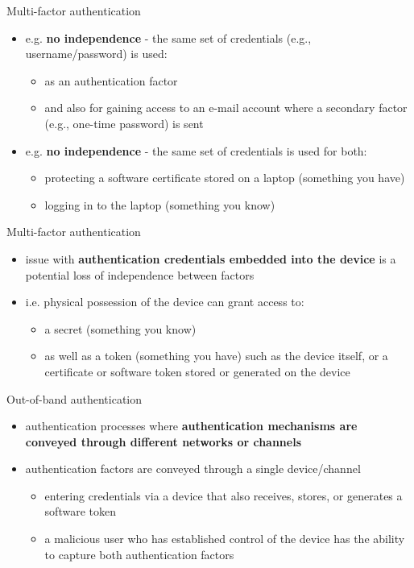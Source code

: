 \documentclass[pdf]{beamer}
\begin{document}
\begin{frame}{Multi-factor authentication}
\begin{itemize}
\item
e.g. \textbf{no independence} - the same set of credentials (e.g., username/password) is used:
\begin{itemize}
\item
as an authentication factor
\item
and also for gaining access to an e-mail account where a secondary factor (e.g., one-time password) is sent
\end{itemize}
\item
e.g. \textbf{no independence} - the same set of credentials is used for both:
\begin{itemize}
\item
protecting a software certificate stored on a laptop (something you have)
\item
logging in to the laptop (something you know) 
\end{itemize}
\end{itemize}
\end{frame}



\begin{frame}{Multi-factor authentication}
\begin{itemize}
\item
issue with \textbf{authentication credentials embedded into the device} is a potential loss of independence between factors

\item
i.e. physical possession of the device can grant access to:
\begin{itemize}
\item
a secret (something you know) 
\item
as well as a token (something you have) such as the device itself, or a certificate or software token stored or generated on the device
\end{itemize}
\end{itemize}
\end{frame}



\begin{frame}{Out-of-band authentication}
\begin{itemize}
\item
authentication processes where \textbf{authentication mechanisms are conveyed through different networks or channels}
\newline

\item
authentication factors are conveyed through a single device/channel
\begin{itemize}
\item
entering credentials via a device that also receives, stores, or generates a software token
\item
a malicious user who has established control of the device has the ability to capture both authentication factors
\end{itemize}
\end{itemize}
\end{frame}
\end{document}
